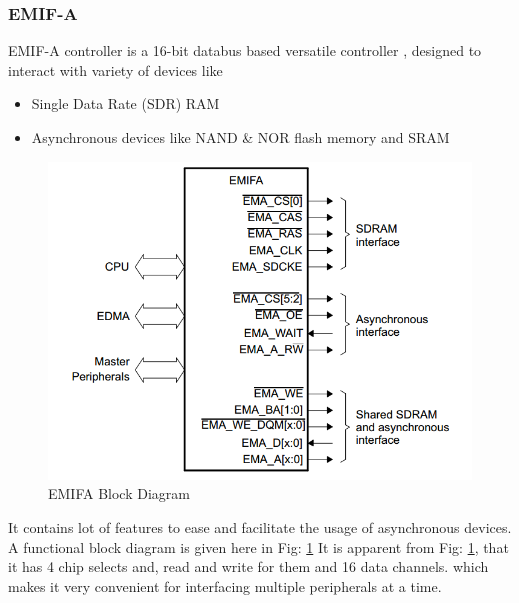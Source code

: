 \begin{appendix}
\subsubsection{EMIF-A}
EMIF-A controller is a 16-bit databus based versatile controller \cite{uguide:emifa}, designed to interact with variety of devices like 
\begin{itemize}
	\item Single Data Rate (SDR) RAM
	\item Asynchronous devices like NAND \& NOR flash memory and SRAM
\end{itemize}

\begin{figure}[h]
	\centering
	\includegraphics[scale=0.4]{fig/EMIFA.png}
	\caption{EMIFA Block Diagram \cite{uguide:emifa} }
	\label{fig:EMIFA}
\end{figure}

It contains lot of features to ease and facilitate the usage of asynchronous devices. A functional block diagram is given here in Fig: \ref{fig:EMIFA} It is apparent from Fig: \ref{fig:EMIFA}, that it has 4 chip selects and, read and write for them and 16 data channels. which makes it very convenient for interfacing multiple peripherals at a time. 



\end{appendix}
